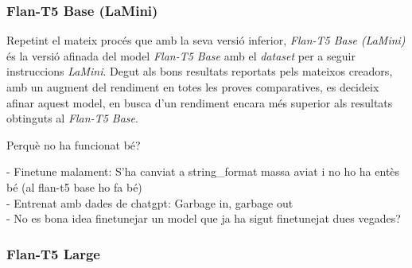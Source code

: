 \subsubsection{Flan-T5 Base (LaMini)}
Repetint el mateix procés que amb la seva versió inferior, \textit{Flan-T5 Base (LaMini)} \cite{flan-t5} \cite{lamini} és la versió afinada del model \textit{Flan-T5 Base} amb el \textit{dataset} per a seguir instruccions \textit{LaMini}. Degut als bons resultats reportats pels mateixos creadors, amb un augment del rendiment en totes les proves comparatives, es decideix afinar aquest model, en busca d'un rendiment encara més superior als resultats obtinguts al \textit{Flan-T5 Base}.

Perquè no ha funcionat bé?

 - Finetune malament: S'ha canviat a string\_format massa aviat i no ho ha entès bé (al flan-t5 base ho fa bé) \\
 - Entrenat amb dades de chatgpt: Garbage in, garbage out \\
 - No es bona idea finetunejar un model que ja ha sigut finetunejat dues vegades?

\subsubsection{Flan-T5 Large}


